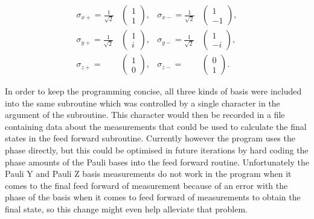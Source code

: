 \begin{equation}
\begin{array}{lclc}
  \sigma_{x+}=\displaystyle\frac{1}{\sqrt{2}}\!\!\!\!\! & \begin{pmatrix}{1}\\{1}\end{pmatrix}, & \sigma_{x-}=\displaystyle\frac{1}{\sqrt{2}}\!\!\!\!\! & \begin{pmatrix}{1}\\{-1}\end{pmatrix}, \\
  \sigma_{y+}=\displaystyle\frac{1}{\sqrt{2}}\!\!\!\!\! & \begin{pmatrix}{1}\\{i}\end{pmatrix}, & \sigma_{y-}=\displaystyle\frac{1}{\sqrt{2}}\!\!\!\!\! & \begin{pmatrix}{1}\\{-i}\end{pmatrix}, \\
  \sigma_{z+}=                                          & \begin{pmatrix}{1}\\{0}\end{pmatrix}, & \sigma_{z-}=                                          & \begin{pmatrix}{0}\\{1}\end{pmatrix}.
\end{array}
\end{equation}

In order to keep the programming concise, all three kinds of basis were included into the same subroutine which was controlled by a single character in the argument of the subroutine. This character would then be recorded in a file containing data about the measurements that could be used to calculate the final states in the feed forward subroutine. Currently however the program uses the phase directly, but this could be optimised in future iterations by hard coding the phase amounts of the Pauli bases into the feed forward routine. Unfortunately the Pauli Y and Pauli Z basis measurements do not work in the program when it comes to the final feed forward of measurement because of an error with the phase of the basis when it comes to feed forward of measurements to obtain the final state, so this change might even help alleviate that problem.



